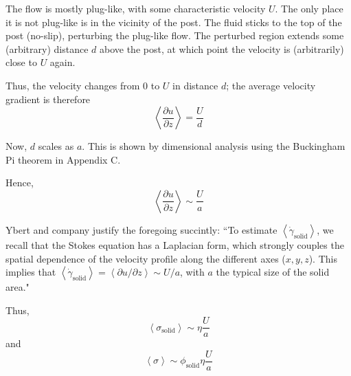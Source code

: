 \documentclass[a4paper]{report}
\newcommand{\phisol}{\ensuremath{\phi_{\mathrm{solid}}}}
\newcommand{\sigsol}{\ensuremath{\sigma_{\mathrm{solid}}}}
\newcommand{\gamsol}{\ensuremath{ \dot{\gamma}_{\mathrm{solid}} }}
\begin{document}
The flow is mostly plug-like, with some characteristic velocity $U$.  The only place it is not plug-like is in the vicinity of the post.  The fluid sticks to the top of the post (no-slip), perturbing the plug-like flow.  The perturbed region extends some (arbitrary) distance $d$ above the post, at which point the velocity is (arbitrarily) close to $U$ again.  

\begin{center}
\end{center}

Thus, the velocity changes from 0 to $U$ in distance $d$; the average velocity gradient is therefore
\begin{equation*}
\left< \frac{\partial u}{\partial z} \right> = \frac{U}{d}
\end{equation*}

Now, $d$ scales as $a$.  This is shown by dimensional analysis using the Buckingham Pi theorem in Appendix C.

Hence,
\begin{equation*}
\left< \frac{\partial u}{\partial z} \right> \sim \frac{U}{a}
\end{equation*}

Ybert and company justify the foregoing succintly: ``To estimate $ \left< \gamsol \right> $, we recall that the Stokes equation has a Laplacian form, which strongly couples the spatial dependence of the velocity profile along the different axes ($x,y,z$). This implies that $ \left< \gamsol \right> = \left< \partial u / \partial z \right> \sim U/a $, with $a$ the typical size of the solid area."

Thus, 
\begin{equation*}
\left< \sigsol \right> \sim \eta \frac{U}{a}
\end{equation*}
and
\begin{equation*}
\left< \sigma \right> \sim \phisol \eta \frac{U}{a}
\end{equation*}
\end{document}

